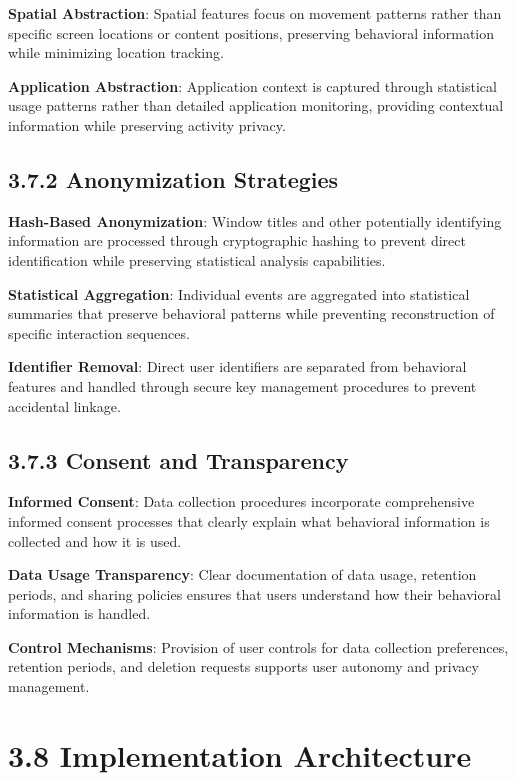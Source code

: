 \documentclass[
  12pt,
  a4paper,
]{report}
\begin{document}
\textbf{Spatial Abstraction}: Spatial features focus on movement
patterns rather than specific screen locations or content positions,
preserving behavioral information while minimizing location tracking.

\textbf{Application Abstraction}: Application context is captured
through statistical usage patterns rather than detailed application
monitoring, providing contextual information while preserving activity
privacy.

\subsection{3.7.2 Anonymization
Strategies}\label{anonymization-strategies}

\textbf{Hash-Based Anonymization}: Window titles and other potentially
identifying information are processed through cryptographic hashing to
prevent direct identification while preserving statistical analysis
capabilities.

\textbf{Statistical Aggregation}: Individual events are aggregated into
statistical summaries that preserve behavioral patterns while preventing
reconstruction of specific interaction sequences.

\textbf{Identifier Removal}: Direct user identifiers are separated from
behavioral features and handled through secure key management procedures
to prevent accidental linkage.

\subsection{3.7.3 Consent and
Transparency}\label{consent-and-transparency}

\textbf{Informed Consent}: Data collection procedures incorporate
comprehensive informed consent processes that clearly explain what
behavioral information is collected and how it is used.

\textbf{Data Usage Transparency}: Clear documentation of data usage,
retention periods, and sharing policies ensures that users understand
how their behavioral information is handled.

\textbf{Control Mechanisms}: Provision of user controls for data
collection preferences, retention periods, and deletion requests
supports user autonomy and privacy management.

\section{3.8 Implementation
Architecture}\label{implementation-architecture}
\end{document}
